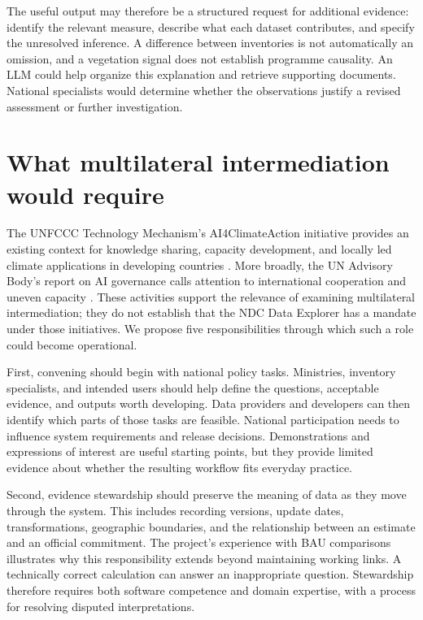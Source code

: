 \documentclass[11pt]{article}
\begin{document}
The useful output may therefore be a structured request for additional evidence: identify the relevant measure, describe what each dataset contributes, and specify the unresolved inference. A difference between inventories is not automatically an omission, and a vegetation signal does not establish programme causality. An LLM could help organize this explanation and retrieve supporting documents. National specialists would determine whether the observations justify a revised assessment or further investigation.

\section*{What multilateral intermediation would require}

The UNFCCC Technology Mechanism's AI4ClimateAction initiative provides an existing context for knowledge sharing, capacity development, and locally led climate applications in developing countries \cite{unfcccai}. More broadly, the UN Advisory Body's report on AI governance calls attention to international cooperation and uneven capacity \cite{unai2024}. These activities support the relevance of examining multilateral intermediation; they do not establish that the NDC Data Explorer has a mandate under those initiatives. We propose five responsibilities through which such a role could become operational.

First, convening should begin with national policy tasks. Ministries, inventory specialists, and intended users should help define the questions, acceptable evidence, and outputs worth developing. Data providers and developers can then identify which parts of those tasks are feasible. National participation needs to influence system requirements and release decisions. Demonstrations and expressions of interest are useful starting points, but they provide limited evidence about whether the resulting workflow fits everyday practice.

Second, evidence stewardship should preserve the meaning of data as they move through the system. This includes recording versions, update dates, transformations, geographic boundaries, and the relationship between an estimate and an official commitment. The project's experience with BAU comparisons illustrates why this responsibility extends beyond maintaining working links. A technically correct calculation can answer an inappropriate question. Stewardship therefore requires both software competence and domain expertise, with a process for resolving disputed interpretations.
\end{document}
